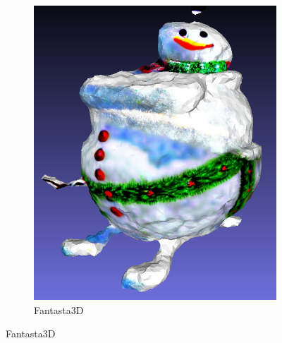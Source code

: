 \begin{figure}[ht]
\begin{subfigure}[b]{0.241\textwidth}
        \includegraphics[width=\textwidth]{etc/a detailed rendering of a snow globe containing a snowman/fantasia3d/fantasia3d_globe_result.png}
        \caption{Fantasta3D}
        \vspace{0.1cm}
    \end{subfigure}


\end{figure}
